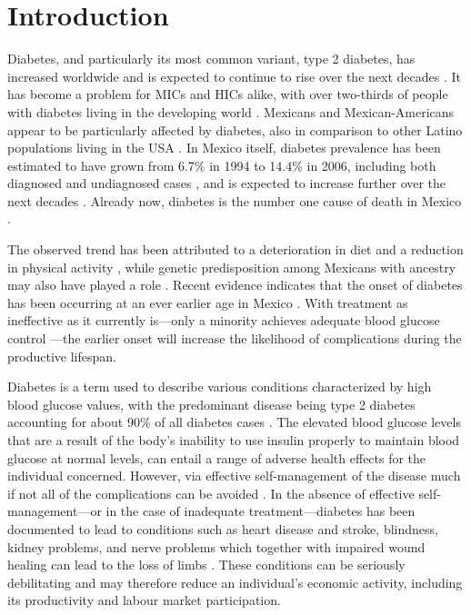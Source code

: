 \section{\label{sec:Introduction4}Introduction }

Diabetes, and particularly its most common variant, type 2 diabetes, has increased worldwide and is expected to continue to rise over the next decades \parencite{Risk2016}. It has become a problem for \acfp{MIC} and \acfp{HIC} alike, with over two-thirds of people with diabetes living in the developing world \parencite{InternationalDiabetesFederation2013}. Mexicans and Mexican-Americans appear to be particularly affected by diabetes, also in comparison to other Latino populations living in the USA \parencite{Schneiderman2014}. In Mexico itself, diabetes prevalence has been estimated to have grown from 6.7\% in 1994 to 14.4\% in 2006, including both diagnosed and undiagnosed cases \parencite{Barquera2013}, and is expected to increase further over the next decades \parencite{Meza2015}. Already now, diabetes is the number one cause of death in Mexico \parencite{Barquera2013}. 

The observed trend has been attributed to a deterioration in diet and a reduction in physical activity \parencite{Barquera2008b,Basu2013}, while genetic predisposition among Mexicans with \DIFdelbegin {}\DIFdelend \DIFaddbegin {}\DIFaddend ancestry may also have played a role \parencite{Williams2013}. Recent evidence indicates that the onset of diabetes has been occurring at an ever earlier age in Mexico \parencite{Villalpando2010}. With treatment as ineffective as it currently is---only a minority achieves adequate blood glucose control \parencite{Barquera2013}---the earlier onset will increase the likelihood of complications during the productive lifespan. 

Diabetes is a term used to describe various conditions characterized by high blood glucose values, with the predominant disease being type 2 diabetes accounting for about 90\% of all diabetes cases \parencite{Sicree2009}. The elevated
blood glucose levels that are a result of the body's inability to use insulin properly to maintain blood glucose at normal levels, can entail a range of adverse health effects for the individual concerned. However, via effective self-management of the disease much if not all of the complications can be avoided \parencite{Lim2011, Gregg2012}. In the absence of effective self-management---or in the case of inadequate treatment---diabetes has been documented to lead to conditions such as heart disease and stroke, blindness, kidney problems, and nerve problems which together with impaired wound healing can lead to the loss of limbs \parencite{Reynoso-Noveron2011}. These conditions can be seriously debilitating and may therefore reduce an individual's economic activity, including its productivity and labour market participation.

